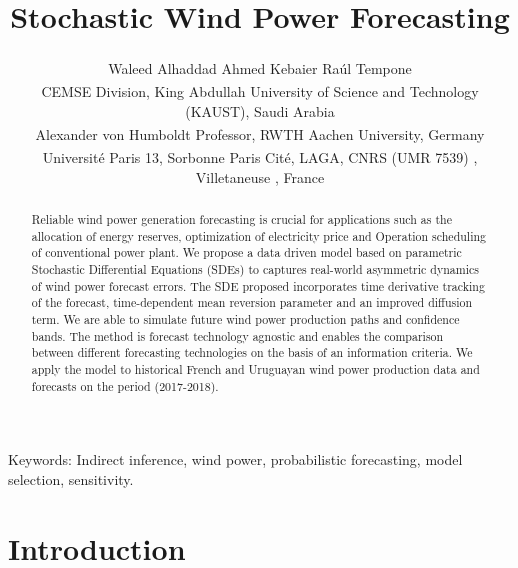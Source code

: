 \documentclass[10pt,twocolumn,letterpaper]{article}
\begin{document}
\title{ Stochastic Wind Power Forecasting }  %

\author{ Waleed Alhaddad\textsuperscript{\textasteriskcentered} \qquad Ahmed Kebaier\textsuperscript{\ddag} \qquad Ra\'ul  Tempone\textsuperscript{\textasteriskcentered}\textsuperscript{\textdagger} \\
\textsuperscript{\textasteriskcentered}CEMSE Division, King Abdullah University of Science and Technology (KAUST), Saudi Arabia \\ \textsuperscript{\textdagger}Alexander von Humboldt Professor, RWTH Aachen University,  Germany
 \\ \textsuperscript{\ddag}Université Paris 13, Sorbonne Paris Cité, LAGA, CNRS (UMR 7539) , Villetaneuse , France }

\maketitle
{\color{red}Keywords: Indirect inference, wind power, probabilistic forecasting, model selection, sensitivity.}

\begin{abstract}

Reliable wind power generation forecasting is crucial for applications such as the allocation of energy reserves, optimization of electricity price and Operation scheduling of conventional power plant. We propose a data driven model based on parametric Stochastic Differential Equations (SDEs) to captures real-world asymmetric dynamics of wind power forecast errors. The SDE proposed incorporates time derivative tracking of the forecast, time-dependent mean reversion parameter and an improved diffusion term. We are able to simulate future wind power production paths and confidence bands. The method is forecast technology agnostic and enables the comparison between different forecasting technologies on the basis of an information criteria. We apply the model to historical French and Uruguayan wind power production data and forecasts on the period (2017-2018).


\end{abstract}

\section{Introduction}
\end{document}
